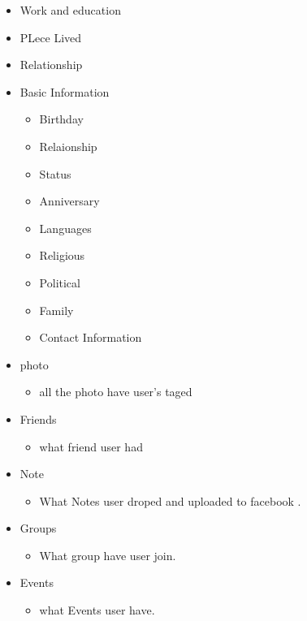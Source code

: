 \begin{itemize}

\item Work and education

\item PLece Lived

\item Relationship

\item Basic Information
    \begin{itemize}
        \item Birthday
        \item Relaionship
        \item Status
        \item Anniversary
        \item Languages
        \item Religious
        \item Political
        \item Family
        \item Contact Information
    \end{itemize}

\item photo 
    \begin{itemize}
    \item all the photo have user's taged 
    \end{itemize}

\item Friends
    \begin{itemize}
    \item what friend user had
    \end{itemize}

\item Note
    \begin{itemize}
    \item What Notes user droped and uploaded to facebook .
    \end{itemize}

\item Groups
    \begin{itemize}
    \item What group have user join.
    \end{itemize}

\item Events
    \begin{itemize}
    \item what Events user have.
    \end{itemize}


\end{itemize}
